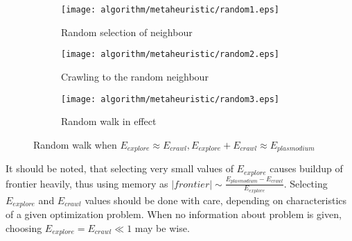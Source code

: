\begin{figure}
  \centering

  \begin{subfigure}{0.3\textwidth}
    \centering
    \texttt{[image: algorithm/metaheuristic/random1.eps]}
    \caption{Random selection of neighbour}
  \end{subfigure}
  \begin{subfigure}{0.3\textwidth}
    \centering
    \texttt{[image: algorithm/metaheuristic/random2.eps]}
    \caption{Crawling to the random neighbour}
  \end{subfigure}
  \begin{subfigure}{0.3\textwidth}
    \centering
    \texttt{[image: algorithm/metaheuristic/random3.eps]}
    \caption{Random walk in effect}
  \end{subfigure}

  \caption{Random walk when $E_{explore} \approx E_{crawl}, E_{explore} + E_{crawl} \approx E_{plasmodium}$}
  \label{figure:m_explore_special}
\end{figure}

It should be noted, that selecting very small values of $E_{explore}$ causes buildup of frontier heavily, thus using memory as $|frontier| \sim \frac{E_{plasmodium} - E_{crawl}}{E_{explore}}$. Selecting $E_{explore}$ and $E_{crawl}$ values should be done with care, depending on characteristics of a given optimization problem. When no information about problem is given, choosing $E_{explore} = E_{crawl} \ll 1$ may be wise. 

